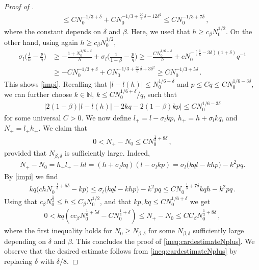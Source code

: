 \documentclass[reqno]{amsart}
\theoremstyle{plain}
\theoremstyle{definition}
\numberwithin{equation}{section}
\newcommand{\N}{\mathbb{N}}
\begin{document}
\begin{proof}[Proof of ]
\begin{align*}
&\le C   N_0^{-1/3+\delta} + C N_0^{-1/3 + \frac{20}{3}\delta-12\delta^2  } \le CN_0^{-1/3 + 7  \delta}\,,
\end{align*}
where the constant depends on $\delta$ and $\beta$. Here, we used that $h \ge c_\beta N_0^{1/2}$.   On the other hand,   using again $h \ge c_\beta N_0^{1/2}$,
\begin{align*}
 \sigma_l   \Big( \frac{l}{h} - \frac{p}{q} \Big) & \ge -\frac{1+N_0^{1/6+\delta}}{h} +  \sigma_l   \Big( \frac{1}{1-\beta}      - \frac{p}{q} \Big) \ge -\frac{CN_0^{1/6+\delta}}{h} +   cN_0^{-(\frac{1}{6}- 3 \delta)(1+\delta)} q^{-1} \\
&\ge -CN_0^{-1/3+\delta} + C N_0^{-1/3 + \frac{35}{6}\delta+3\delta^2  } \ge CN_0^{-1/3 + 5  \delta}\,.
\end{align*}
 This shows \eqref{impi}.  Recalling   that   $|l-l(h)| \le N_0^{1/6+\delta}$ and  $ p \le Cq \le C N_0^{1/6-3\delta}$, we can further  choose $k \in \N$, $k \le C N_0^{1/6+\delta}/q $, such that 
\begin{align}\label{kkk}
\big| 2(1-\beta) |l-l(h)|  - 2kq - 2(1-\beta) kp \big| \le CN_0^{1/6-3\delta}
\end{align}
for  some   universal $C>0$. 
We now define $l_+ = l  - \sigma_l  kp$, $h_+ = h +  \sigma_l  kq$,
and $N_+=l_+h_+$.  We  claim  that 
\begin{align}\label{ineq:cardestimateNplus}
0 < N_+-N_0 \leq C  N_0^{\frac{1}{3} + 8  \delta}\,, 
\end{align}
 provided that $ N_{\beta,\delta} $ is sufficiently large.  Indeed, 
\begin{align*}
N_+-N_0= h_+l_+ -hl = (h +  \sigma_l  kq)(l -  \sigma_l  kp) =     \sigma_l  \big( k ql-k  h  p \big)   -k^2pq .
\end{align*}
By \eqref{impi} we find
\begin{align*}
kq \big(c  h  N_0^{-\frac{1}{3}+ 5  \delta} - kp\big)\leq   \sigma_l   \big( k ql-k h   p \big)   -k^2pq \leq CN_0^{-\frac{1}{3} +  7  \delta} k q h -k^2 pq\,.
\end{align*}
Using that $ c_\beta  N_0^{\frac{1}{2}}\le h \le  C_\beta  N_0^{1/2}$,
and  that  $kp, kq \le CN_0^{1/6+\delta}$ we get 
\begin{align*}
0<kq  (cc_\beta N_0^{\frac{1}{6}+ 5 \delta} -CN_0^{\frac{1}{6}+ \delta  }   )\leq N_+ - N_0 \le  CC_\beta    N_0^{\frac{1}{3} + 8  \delta}\,,
\end{align*}
where the first  inequality holds for $N_0\ge N_{\beta,\delta} $ for some $ N_{\beta,\delta}  $ sufficiently large depending on $\delta$  and $\beta$.  This concludes the proof of \eqref{ineq:cardestimateNplus}.  We observe that the desired estimate follows from \eqref{ineq:cardestimateNplus} by replacing $\delta$ with $ \delta/8  $. 


\end{proof}
\end{document}
